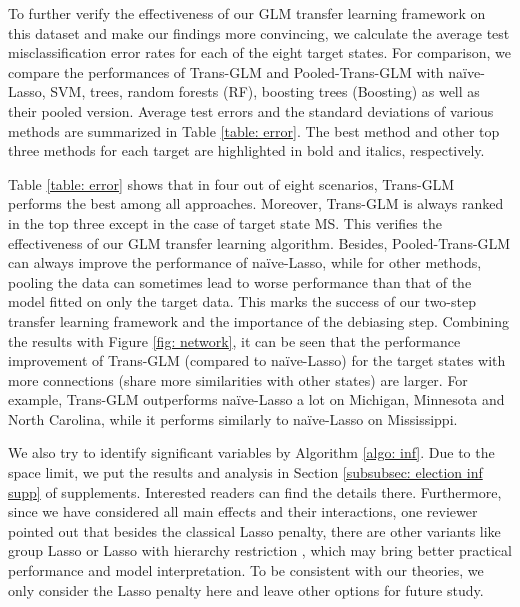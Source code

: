 \documentclass[12pt]{article}
\newcommand{\<}{\langle}
\renewcommand{\>}{\rangle}
\begin{document}
To further verify the effectiveness of our GLM transfer learning framework on this dataset and make our findings more convincing, we calculate the average test misclassification error rates for each of the eight target states. For comparison, we compare the performances of Trans-GLM and Pooled-Trans-GLM with na\"ive-Lasso, SVM, trees, random forests (RF), boosting trees (Boosting) as well as their pooled version. Average test errors and the standard deviations of various methods are summarized in Table \ref{table: error}. The best method and other top three methods for each target are highlighted in bold and italics, respectively.


Table \ref{table: error} shows that in four out of eight scenarios, Trans-GLM performs the best among all approaches. Moreover, Trans-GLM is always ranked in the top three except in the case of target state MS. This verifies the effectiveness of our GLM transfer learning algorithm. Besides, Pooled-Trans-GLM can always improve the performance of na\"ive-Lasso, while for other methods, pooling the data can sometimes lead to worse performance than that of the model fitted on only the target data. This marks the success of our two-step transfer learning framework and the importance of the debiasing step. Combining the results with Figure \ref{fig: network}, it can be seen that the performance improvement of Trans-GLM (compared to na\"ive-Lasso) for the target states with more connections (share more similarities with other states) are larger. For example, Trans-GLM outperforms na\"ive-Lasso a lot on Michigan, Minnesota and North Carolina, while it performs similarly to na\"ive-Lasso on Mississippi. 

We also try to identify significant variables by Algorithm \ref{algo: inf}. Due to the space limit, we put the results and analysis in Section \ref{subsubsec: election inf supp} of supplements. Interested readers can find the details there. Furthermore, since we have considered all main effects and their interactions, one reviewer pointed out that besides the classical Lasso penalty, there are other variants like group Lasso \citep{yuan2006model} or Lasso with hierarchy restriction \citep{bien2013lasso}, which may bring better practical performance and model interpretation. To be consistent with our theories, we only consider the Lasso penalty here and leave other options for future study.


\end{document}
